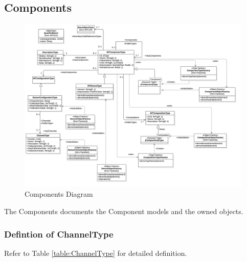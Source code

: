 \subsection{Components}

\begin{figure}
  \centering
    \includegraphics[width=1.0\textwidth]{diagrams/Components.png}
  \caption{Components Diagram}
  \label{fig:Components}
\end{figure}


The Components documents the Component models and the owned objects.

\subsubsection{Defintion of ChannelType} \label{type:ChannelType}



Refer to Table \ref{table:ChannelType} for detailed definition.

